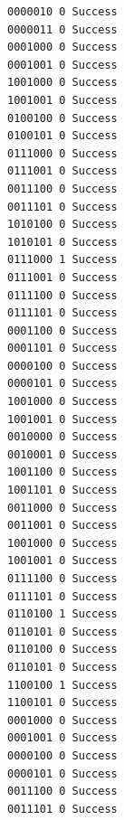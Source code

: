 \documentclass[12pt]{article}
\begin{document}
\begin{verbatim}
0000010 0 Success
0000011 0 Success
0001000 0 Success
0001001 0 Success
1001000 0 Success
1001001 0 Success
0100100 0 Success
0100101 0 Success
0111000 0 Success
0111001 0 Success
0011100 0 Success
0011101 0 Success
1010100 0 Success
1010101 0 Success
0111000 1 Success
0111001 0 Success
0111100 0 Success
0111101 0 Success
0001100 0 Success
0001101 0 Success
0000100 0 Success
0000101 0 Success
1001000 0 Success
1001001 0 Success
0010000 0 Success
0010001 0 Success
1001100 0 Success
1001101 0 Success
0011000 0 Success
0011001 0 Success
1001000 0 Success
1001001 0 Success
0111100 0 Success
0111101 0 Success
0110100 1 Success
0110101 0 Success
0110100 0 Success
0110101 0 Success
1100100 1 Success
1100101 0 Success
0001000 0 Success
0001001 0 Success
0000100 0 Success
0000101 0 Success
0011100 0 Success
0011101 0 Success
\end{verbatim}
\end{document}
